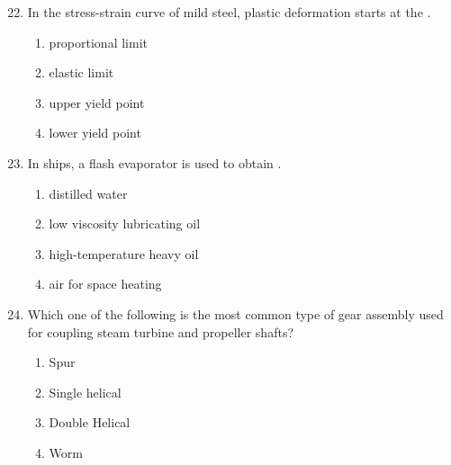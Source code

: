 \documentclass[journal]{IEEEtran}
\theoremstyle{remark}
\begin{document}
\begin{enumerate}[itemsep=1em]
\setcounter{enumi}{21}
\item In the stress-strain curve of mild steel, plastic deformation starts at the \underline{\hspace{2cm}}.
\begin{enumerate}[leftmargin=2.5em, labelsep=0.5em, itemsep=0.5em]
    \item proportional limit
    \item elastic limit
    \item upper yield point
    \item lower yield point
\end{enumerate}
\end{enumerate}

\begin{enumerate}[itemsep=1em]
\setcounter{enumi}{22}
\item In ships, a flash evaporator is used to obtain \underline{\hspace{1cm}}.
\begin{enumerate}[leftmargin=2.5em, labelsep=0.5em, itemsep=0.5em]
    \item distilled water
    \item low viscosity lubricating oil
    \item high-temperature heavy oil
    \item air for space heating
\end{enumerate}
\end{enumerate}

\newpage
\vspace*{0.25cm}

\begin{enumerate}[itemsep=1em]
\setcounter{enumi}{23}
\item Which one of the following is the most common type of gear assembly used for coupling steam turbine and propeller shafts?
\begin{multicols}{4}
\begin{enumerate}
    \item Spur
    \item Single helical
    \item Double Helical
    \item Worm
\end{enumerate}
\end{multicols}
\end{enumerate}
\end{document}
